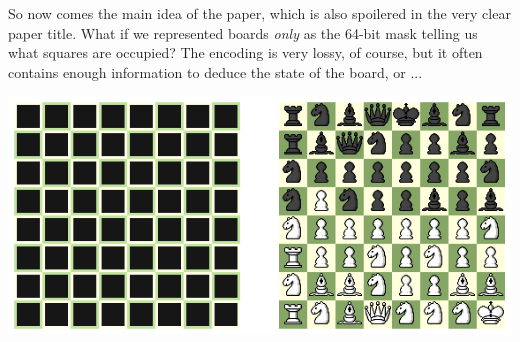 \documentclass[twocolumn]{amsart}
\begin{document}
So now comes the main idea of the paper, which is also spoilered in the
very clear paper title. What if we represented boards {\em only} as the
64-bit mask telling us what squares are occupied? The encoding is very
lossy, of course, but it often contains enough information to deduce
the state of the board, or ...

% 
% 
% 
% 
% 
% 
% 
% 
% 
% 

\includegraphics[width=0.9 \linewidth]{blind-allon}

{}

\end{document}

